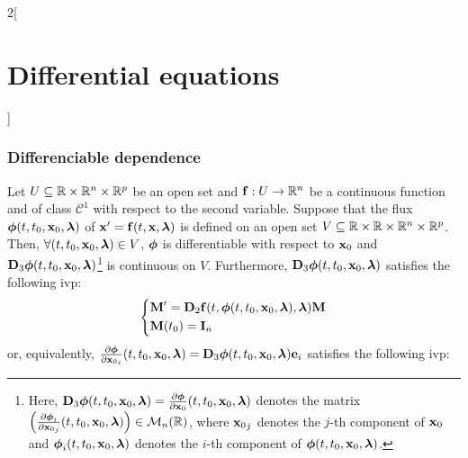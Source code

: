 \documentclass[../../../main.tex]{subfiles}
\begin{document}
\begin{multicols}{2}[\section{Differential equations}]
  \subsubsection{Differenciable dependence}
  \begin{theorem}
    Let $U\subseteq\mathbb{R}\times\mathbb{R}^n\times\mathbb{R}^p$ be an open set and $\boldsymbol{\mathrm{f}}:U\rightarrow\mathbb{R}^n$ be a continuous function and of class $\mathcal{C}^1$ with respect to the second variable. Suppose that the flux $\boldsymbol{\mathrm{\phi}}(t,t_0,\boldsymbol{\mathrm{x}}_0,\boldsymbol{\mathrm{\lambda}})$ of $\boldsymbol{\mathrm{x}}'=\boldsymbol{\mathrm{f}}(t,\boldsymbol{\mathrm{x}},\boldsymbol{\mathrm{\lambda}})$ is defined on an open set $V\subseteq\mathbb{R}\times\mathbb{R}\times\mathbb{R}^n\times\mathbb{R}^p$. Then, $\forall (t,t_0,\boldsymbol{\mathrm{x}}_0,\boldsymbol{\mathrm{\lambda}})\in V$, $\boldsymbol{\mathrm{\phi}}$ is differentiable with respect to $\boldsymbol{\mathrm{x}}_0$ and $\boldsymbol{\mathrm{D}}_3\boldsymbol{\mathrm{\phi}}(t,t_0,\boldsymbol{\mathrm{x}}_0,\boldsymbol{\mathrm{\lambda}})$\footnote{Here, $\boldsymbol{\mathrm{D}}_3\boldsymbol{\mathrm{\phi}}(t,t_0,\boldsymbol{\mathrm{x}}_0,\boldsymbol{\mathrm{\lambda}})=\frac{\partial\boldsymbol{\mathrm{\phi}}}{\partial \boldsymbol{\mathrm{x}}_0}(t,t_0,\boldsymbol{\mathrm{x}}_0,\boldsymbol{\mathrm{\lambda}})$ denotes the matrix $\left(\frac{\partial\boldsymbol{\mathrm{\phi}}_i}{\partial{\boldsymbol{\mathrm{x}}_0}_j}(t,t_0,\boldsymbol{\mathrm{x}}_0,\boldsymbol{\mathrm{\lambda}})\right)\in\mathcal{M}_n(\mathbb{R})$, where ${\boldsymbol{\mathrm{x}}_0}_j$ denotes the $j$-th component of $\boldsymbol{\mathrm{x}}_0$ and $\boldsymbol{\mathrm{\phi}}_i(t,t_0,\boldsymbol{\mathrm{x}}_0,\boldsymbol{\mathrm{\lambda}})$ denotes the $i$-th component of $\boldsymbol{\mathrm{\phi}}(t,t_0,\boldsymbol{\mathrm{x}}_0,\boldsymbol{\mathrm{\lambda}})$.} is continuous on $V$. Furthermore, $\boldsymbol{\mathrm{D}}_3\boldsymbol{\mathrm{\phi}}(t,t_0,\boldsymbol{\mathrm{x}}_0,\boldsymbol{\mathrm{\lambda}})$ satisfies the following ivp:
    \begin{equation*}
      \left\{
      \begin{aligned}
         & \boldsymbol{\mathrm{M}}'      =\boldsymbol{\mathrm{D}}_2\boldsymbol{\mathrm{f}}(t,\boldsymbol{\mathrm{\phi}}(t,t_0,\boldsymbol{\mathrm{x}}_0,\boldsymbol{\mathrm{\lambda}}),\boldsymbol{\mathrm{\lambda}})\boldsymbol{\mathrm{M}} \\
         & \boldsymbol{\mathrm{M}}(t_0)  =\boldsymbol{\mathrm{I}}_n
      \end{aligned}
      \right.
    \end{equation*}
    or, equivalently, $\frac{\partial\boldsymbol{\mathrm{\phi}}}{\partial {\boldsymbol{\mathrm{x}}_0}_i}(t,t_0,\boldsymbol{\mathrm{x}}_0,\boldsymbol{\mathrm{\lambda}})=\boldsymbol{\mathrm{D}}_3\boldsymbol{\mathrm{\phi}}(t,t_0,\boldsymbol{\mathrm{x}}_0,\boldsymbol{\mathrm{\lambda}})\boldsymbol{\mathrm{e}}_i$ satisfies the following ivp:

\end{theorem}
\end{multicols}
\end{document}

